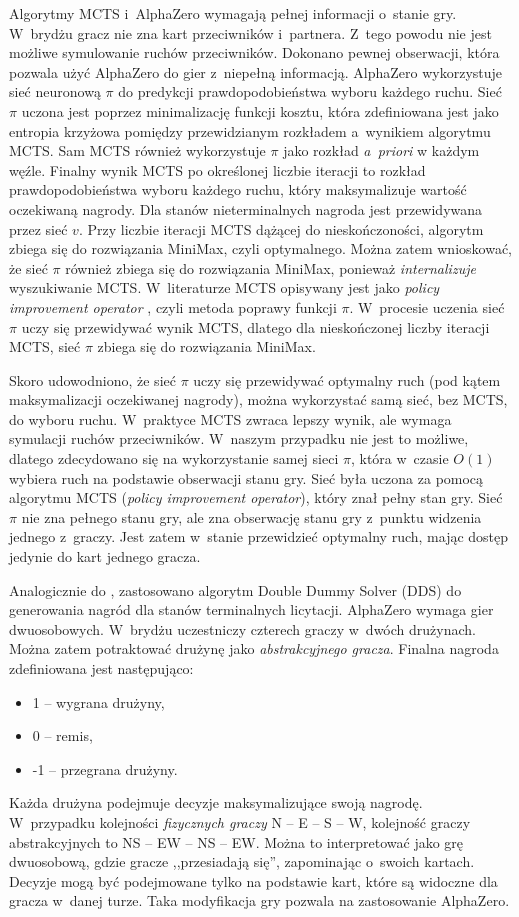Algorytmy MCTS i~AlphaZero wymagają pełnej informacji o~stanie gry.
W~brydżu gracz nie zna kart przeciwników i~partnera.
Z~tego powodu nie jest możliwe symulowanie ruchów przeciwników.
Dokonano pewnej obserwacji, która pozwala użyć AlphaZero do gier
z~niepełną informacją.
AlphaZero wykorzystuje sieć neuronową $\pi$ do predykcji
prawdopodobieństwa wyboru każdego ruchu.
Sieć $\pi$ uczona jest poprzez minimalizację funkcji kosztu,
która zdefiniowana jest jako entropia krzyżowa pomiędzy
przewidzianym rozkładem a~wynikiem algorytmu MCTS.
Sam MCTS również wykorzystuje $\pi$ jako rozkład
\textit{a~priori} w każdym węźle.
Finalny wynik MCTS po określonej liczbie iteracji
to rozkład prawdopodobieństwa wyboru każdego ruchu,
który maksymalizuje wartość oczekiwaną nagrody.
Dla stanów nieterminalnych nagroda jest przewidywana
przez sieć $v$.
Przy liczbie iteracji MCTS dążącej do nieskończoności,
algorytm zbiega się do rozwiązania MiniMax, czyli optymalnego.
Można zatem wnioskować, że sieć $\pi$ również zbiega się
do rozwiązania MiniMax, ponieważ \textit{internalizuje}
wyszukiwanie MCTS. W~literaturze MCTS opisywany jest jako
\textit{policy improvement operator} \cite{MuZeroPaper,EfficientZeroPaper},
czyli metoda poprawy funkcji $\pi$.
W~procesie uczenia sieć $\pi$ uczy się przewidywać wynik MCTS,
dlatego dla nieskończonej liczby iteracji MCTS,
sieć $\pi$ zbiega się do rozwiązania MiniMax.

Skoro udowodniono, że sieć $\pi$ uczy się przewidywać
optymalny ruch (pod kątem maksymalizacji oczekiwanej nagrody),
można wykorzystać samą sieć, bez MCTS, do wyboru ruchu.
W~praktyce MCTS zwraca lepszy wynik, ale wymaga
symulacji ruchów przeciwników.
W~naszym przypadku nie jest to możliwe, dlatego
zdecydowano się na wykorzystanie samej sieci $\pi$,
która w~czasie $O(1)$ wybiera ruch na podstawie obserwacji stanu gry.
Sieć była uczona za pomocą algorytmu MCTS (\textit{policy improvement operator}),
który znał pełny stan gry.
Sieć $\pi$ nie zna pełnego stanu gry, ale zna obserwację stanu gry
z~punktu widzenia jednego z~graczy.
Jest zatem w~stanie przewidzieć optymalny ruch,
mając dostęp jedynie do kart jednego gracza.

Analogicznie do \cite{rong19,gong20,tian20,lockhart20}, zastosowano
algorytm Double Dummy Solver (DDS) \cite{DDS} do generowania
nagród dla stanów terminalnych licytacji.
AlphaZero wymaga gier dwuosobowych.
W~brydżu uczestniczy czterech graczy w~dwóch drużynach.
Można zatem potraktować drużynę jako \textit{abstrakcyjnego gracza}.
Finalna nagroda zdefiniowana jest następująco:
\begin{itemize}
  \item 1 -- wygrana drużyny,
  \item 0 -- remis,
  \item -1 -- przegrana drużyny.
\end{itemize}
Każda drużyna podejmuje decyzje maksymalizujące swoją nagrodę.
W~przypadku kolejności \textit{fizycznych graczy}
N -- E -- S -- W, kolejność graczy abstrakcyjnych to
NS -- EW -- NS -- EW.
Można to interpretować jako grę dwuosobową,
gdzie gracze ,,przesiadają się'', zapominając o~swoich kartach.
Decyzje mogą być podejmowane tylko na podstawie kart, które
są widoczne dla gracza w~danej turze.
Taka modyfikacja gry pozwala na zastosowanie AlphaZero.


